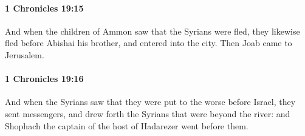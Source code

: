 		\paragraph{1 Chronicles 19:15} %
			\label{1CHRONICLES-19-15}

			And when the children of Ammon saw that the Syrians were fled, they likewise fled before Abishai his brother, and entered into the city. Then Joab came to Jerusalem.


		\paragraph{1 Chronicles 19:16} %
			\label{1CHRONICLES-19-16}

			And when the Syrians saw that they were put to the worse before Israel, they sent messengers, and drew forth the Syrians that were beyond the river: and Shophach the captain of the host of Hadarezer went before them.

